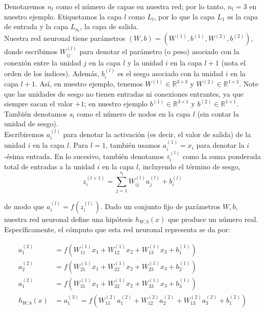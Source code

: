Denotaremos $n_l$ como el número de capas en nuestra red; por lo tanto, $n_l = 3$ en nuestro ejemplo. Etiquetamos la capa $l$ como $L_l$, por lo que la capa $L_1$ es la capa de entrada y la capa $L_{n_l}$, la capa de salida. \\

Nuestra red neuronal tiene parámetros $(W, b) = (W^{(1)}, b^{(1)}, W^{(2)}, b^{(2)})$, donde escribimos $W_{ij}^{(l)}$ para denotar el parámetro (o peso) asociado con la conexión entre la unidad $j$ en la capa $l$ y la unidad $i$ en la capa $l+1$ (nota el orden de los índices). Además, $b_i^{(l)}$ es el sesgo asociado con la unidad $i$ en la capa $l+1$. Así, en nuestro ejemplo, tenemos $W^{(1)} \in \mathbb{R}^{3 \times 3}$ y $W^{(2)} \in \mathbb{R}^{1 \times 3}$. Note que las unidades de sesgo no tienen entradas ni conexiones entrantes, ya que siempre sacan el valor $+1$; en nuestro ejemplo $b^{(1)} \in \mathbb{R}^{3 \times 1}$ y $b^{(2)} \in \mathbb{R}^{1 \times 1}$. También denotamos $s_l$ como el número de nodos en la capa $l$ (sin contar la unidad de sesgo). \\

Escribiremos $a^{(l)}_i$ para denotar la activación (es decir, el valor de salida) de la unidad $i$ en la capa $l$. Para $l = 1$, también usamos $a^{(1)}_i = x_i$ para denotar la $i$-ésima entrada. En lo sucesivo, también denotamos $z^{(l)}_i$ como la suma ponderada total de entradas a la unidad $i$ en la capa $l$, incluyendo el término de sesgo,  
\begin{equation}
z_i^{(l+1)} = \sum_{j=1}^{s_l} W_{ij}^{(l)} a_j^{(l)} + b_i^{(l)}
\end{equation}

\noindent de modo que $a^{(l)}_i = f(z^{(l)}_i)$. Dado un conjunto fijo de parámetros $W, b$, nuestra red neuronal define una hipótesis $h_{W,b}(x)$ que produce un número real. Específicamente, el cómputo que esta red neuronal representa se da por:

\begin{align}
a_1^{(2)} &= f\left(W_{11}^{(1)} x_1 + W_{12}^{(1)} x_2 + W_{13}^{(1)} x_3 + b_1^{(1)}\right) \\
a_2^{(2)} &= f\left(W_{21}^{(1)} x_1 + W_{22}^{(1)} x_2 + W_{23}^{(1)} x_3 + b_2^{(1)}\right) \\
a_1^{(2)} &= f\left(W_{31}^{(1)} x_1 + W_{32}^{(1)} x_2 + W_{33}^{(1)} x_3 + b_3^{(1)}\right) \\
h_{W, b}(x) &= a_1^{(3)} = f\left(W_{11}^{(2)} a_1^{(2)} + W_{12}^{(2)}a_2^{(2)} + W_{13}^{(2)} a_3^{(2)} + b_1^{(2)}\right)
\end{align}


